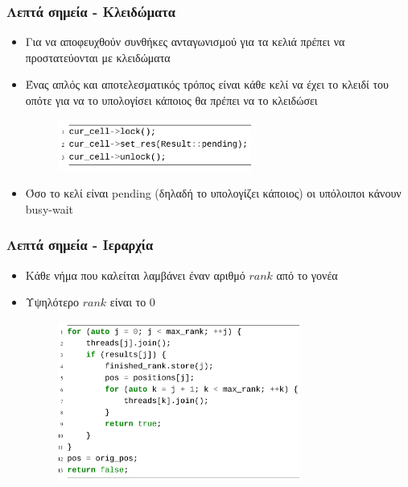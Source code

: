 \documentclass{beamer}
\begin{document}
\begin{frame}
  \frametitle{Λεπτά σημεία - Κλειδώματα}

  \begin{itemize}
	\item Για να αποφευχθούν συνθήκες ανταγωνισμού για τα κελιά πρέπει να προστατεύονται με κλειδώματα
	\item Ένας απλός και αποτελεσματικός τρόπος είναι κάθε κελί να έχει το κλειδί του οπότε για να το υπολογίσει κάποιος θα πρέπει να το κλειδώσει \pause

\begin{figure}[h]
    \centering
	\includegraphics[width=0.60\textwidth]{pics/lock}
\end{figure} \pause
\item Όσο το κελί είναι pending (δηλαδή το υπολογίζει κάποιος) οι υπόλοιποι κάνουν busy-wait
  \end{itemize}
\end{frame}

\begin{frame}
  \frametitle{Λεπτά σημεία - Ιεραρχία}

  \begin{itemize}
	\item Κάθε νήμα που καλείται λαμβάνει έναν αριθμό $rank$ από το γονέα
	\item Υψηλότερο $rank$ είναι το $0$ \pause

\begin{figure}[h]
    \centering
	\includegraphics[width=0.75\textwidth]{pics/hierarchy}
\end{figure} 
  \end{itemize}
\end{frame}
\end{document}
